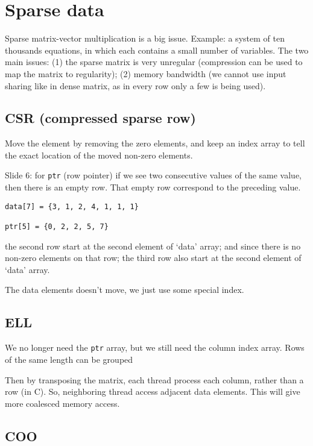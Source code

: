 \section{Sparse data}
\label{sec:sparse-data}

Sparse matrix-vector multiplication is a big issue. Example: a system
of ten thousands equations, in which each contains a small number of
variables. The two main issues: (1) the sparse matrix is very
unregular (compression can be used to map the matrix to regularity);
(2) memory bandwidth (we cannot use input sharing like in dense
matrix, as in every row only a few is being used).

\subsection{CSR (compressed sparse row)}
\label{sec:csr-compr-sparse}

Move the element by removing the zero elements, and keep an index
array to tell the exact location of the moved non-zero elements. 

Slide 6: for \verb!ptr! (row pointer) if we see two consecutive
values of the same value, then there is an empty row. That empty row
correspond to the preceding value. 
\begin{verbatim}
data[7] = {3, 1, 2, 4, 1, 1, 1}

ptr[5] = {0, 2, 2, 5, 7}
\end{verbatim}
the second row start at the second element of `data' array; and since
there is no non-zero elements on that row; the third row also start at
the second element of `data' array.

The data elements doesn't move, we just use some special index.

\subsection{ELL}
\label{sec:ell}

We no longer need the \verb!ptr! array, but we still need the column
index array. Rows of the same length can be grouped 

Then by transposing the matrix, each thread process each column,
rather than a row (in C). So, neighboring thread access adjacent data
elements. This will give more coalesced memory access. 

\subsection{COO}
\label{sec:coo}


